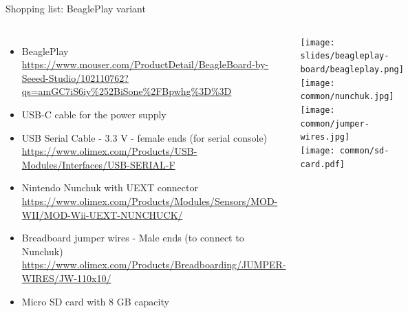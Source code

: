 \begin{frame}[fragile]{Shopping list: BeaglePlay variant}
  \begin{columns}
    \begin{itemize}
    \item BeaglePlay
      {\fontsize{6}{6}\selectfont
        \url{https://www.mouser.com/ProductDetail/BeagleBoard-by-Seeed-Studio/102110762?qs=amGC7iS6iy%252BiSone%2FBpwhg%3D%3D}
      }
    \item USB-C cable for the power supply
    \item USB Serial Cable - 3.3 V - female ends (for serial console)
      {\fontsize{6}{6}\selectfont
        \url{https://www.olimex.com/Products/USB-Modules/Interfaces/USB-SERIAL-F}
      }
    \item Nintendo Nunchuk with UEXT connector
      {\fontsize{6}{6}\selectfont
        \url{https://www.olimex.com/Products/Modules/Sensors/MOD-WII/MOD-Wii-UEXT-NUNCHUCK/}
      }
    \item Breadboard jumper wires - Male ends (to connect to Nunchuk)
      {\fontsize{6}{6}\selectfont
        \url{https://www.olimex.com/Products/Breadboarding/JUMPER-WIRES/JW-110x10/}
      }
    \item Micro SD card with 8 GB capacity
    \end{itemize}
    \begin{center}
      \texttt{[image: slides/beagleplay-board/beagleplay.png]} \\
      \texttt{[image: common/nunchuk.jpg]} \\
      \texttt{[image: common/jumper-wires.jpg]} \\
      \texttt{[image: common/sd-card.pdf]}
    \end{center}
  \end{columns}
\end{frame}